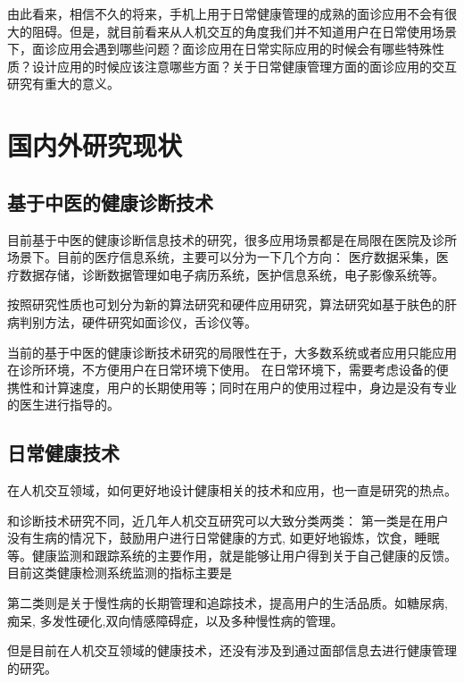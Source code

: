由此看来，相信不久的将来，手机上用于日常健康管理的成熟的面诊应用不会有很大的阻碍。但是，就目前看来从人机交互的角度我们并不知道用户在日常使用场景下，面诊应用会遇到哪些问题？面诊应用在日常实际应用的时候会有哪些特殊性质？设计应用的时候应该注意哪些方面？关于日常健康管理方面的面诊应用的交互研究有重大的意义。

\section{国内外研究现状}

\subsection{基于中医的健康诊断技术}

目前基于中医的健康诊断信息技术的研究，很多应用场景都是在局限在医院及诊所场景下。目前的医疗信息系统，主要可以分为一下几个方向：
医疗数据采集，医疗数据存储，诊断数据管理如电子病历系统，医护信息系统，电子影像系统等。

按照研究性质也可划分为新的算法研究和硬件应用研究，算法研究如基于肤色的肝病判别方法，硬件研究如面诊仪，舌诊仪等。

当前的基于中医的健康诊断技术研究的局限性在于，大多数系统或者应用只能应用在诊所环境，不方便用户在日常环境下使用。
在日常环境下，需要考虑设备的便携性和计算速度，用户的长期使用等；同时在用户的使用过程中，身边是没有专业的医生进行指导的。

\subsection{日常健康技术}

在人机交互领域，如何更好地设计健康相关的技术和应用，也一直是研究的热点。

和诊断技术研究不同，近几年人机交互研究可以大致分类两类： 第一类是在用户没有生病的情况下，鼓励用户进行日常健康的方式, 如更好地锻炼，饮食，睡眠等。健康监测和跟踪系统的主要作用，就是能够让用户得到关于自己健康的反馈。目前这类健康检测系统监测的指标主要是

第二类则是关于慢性病的长期管理和追踪技术，提高用户的生活品质。如糖尿病\cite{mamykina2008mahi:}, 痴呆\cite{yasuda2009remote}, 多发性硬化\cite{ayobi2017quantifying},双向情感障碍症\cite{bardram2013designing}，以及多种慢性病的管理\cite{nunes2015self-care}。

但是目前在人机交互领域的健康技术，还没有涉及到通过面部信息去进行健康管理的研究。


